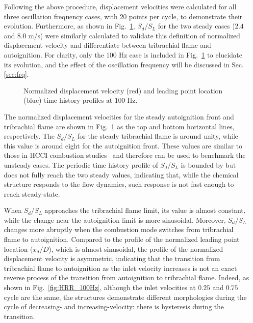 Following the above procedure, displacement velocities were calculated for all three oscillation frequency cases, with $20$ points per cycle, to demonstrate their evolution.  Furthermore, as shown in Fig.~\ref{fig:sd_evo}, $S_d/S_L$ for the two steady cases ($2.4$ and $8.0$ m/s) were similarly calculated to validate this definition of normalized displacement velocity and differentiate between tribrachial flame and autoignition.  For clarity, only the 100 Hz case is included in Fig.~\ref{fig:sd_evo} to elucidate its evolution, and the effect of the oscillation frequency will be discussed in Sec.\ref{sec:frq}.

\begin{figure}[t]
  \centering
  \scriptsize
  \resizebox{1.0\textwidth}{!}{}
  \normalsize
  \caption{Normalized displacement velocity (red) and leading point location (blue) time history profiles at $100$ Hz.}
  \label{fig:sd_evo}
\end{figure}

The normalized displacement velocities for the steady autoignition front and tribrachial flame are shown in Fig.~\ref{fig:sd_evo} as the top and bottom horizontal lines, respectively.  The $S_d/S_L$ for the steady tribrachial flame is around unity, while this value is around eight for the autoignition front.  These values are similar to those in HCCI combustion studies~\cite{yoo13} and therefore can be used to benchmark the unsteady cases.  The periodic time history profile of $S_d/S_L$ is bounded by but does not fully reach the two steady values, indicating that, while the chemical structure responds to the flow dynamics, such response is not fast enough to reach steady-state.  

When $S_d/S_L$ approaches the tribrachial flame limit, its value is almost constant, while the change near the autoignition limit is more sinusoidal.  Moreover, $S_d/S_L$ changes more abruptly when the combustion mode switches from tribrachial flame to autoignition.  Compared to the profile of the normalized leading point location ($x_d/D$), which is almost sinusoidal, the profile of the normalized displacement velocity is asymmetric, indicating that the transition from tribrachial flame to autoignition as the inlet velocity increases is not an exact reverse process of the transition from autoignition to tribrachial flame.  Indeed, as shown in Fig.~\ref{fig:HRR_100Hz}, although the inlet velocities at $0.25$ and $0.75$ cycle are the same, the structures demonstrate different morphologies during the cycle of decreasing- and increasing-velocity: there is hysteresis during the transition.

